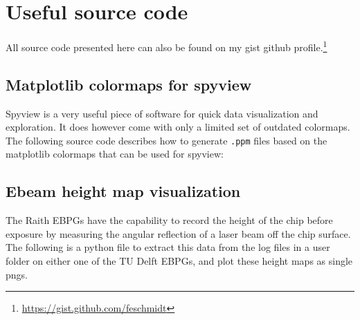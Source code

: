 \chapter{Useful source code}

\clearpage

All source code presented here can also be found on my gist github profile.\footnote{\url{https://gist.github.com/feschmidt}}

\section{Matplotlib colormaps for spyview}\label{app:spyview}
Spyview is a very useful piece of software for quick data visualization and exploration.
It does however come with only a limited set of outdated colormaps.
The following source code describes how to generate \texttt{.ppm} files based on the matplotlib colormaps that can be used for spyview:



\clearpage
\section{Ebeam height map visualization}

The Raith EBPGs have the capability to record the height of the chip before exposure by measuring the angular reflection of a laser beam off the chip surface.
%
The following is a python file to extract this data from the log files in a user folder on either one of the TU Delft EBPGs, and plot these height maps as single pngs.



\clearpage
{}

